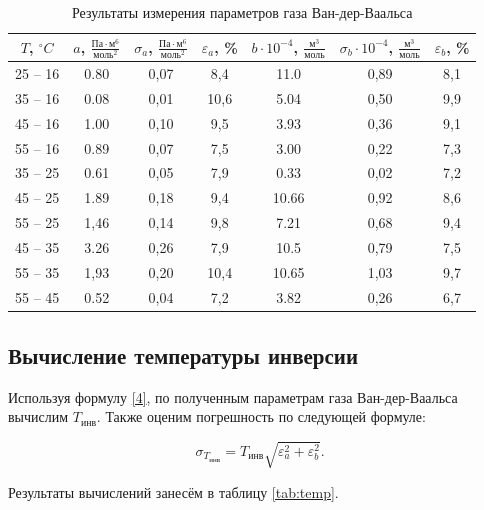 \documentclass[12pt,a4paper]{article}
\begin{document}
\begin{table}[H]
	\centering
	\begin{tabular}{|c|c|c|c|c|c|c|}
		\hline
		$ T $, $ ^\circ C $ & $ a $, $\displaystyle \frac{\text{Па}\cdot\text{м}^6}{\text{моль}^2} $ &$ \sigma_a $, $\displaystyle \frac{\text{Па}\cdot\text{м}^6}{\text{моль}^2} $ & $ \varepsilon_a $, \% & $ b\cdot10^{-4} $, $ \displaystyle\frac{\text{м}^3}{\text{моль}} $ & $ \sigma_b \cdot 10^{-4} $, $\displaystyle \frac{\text{м}^3}{\text{моль}} $ & $ \varepsilon_b $, \% \\ \hline
		25 -- 16 & 0.80 & 0,07 & 8,4 & 11.0 & 0,89 & 8,1 \\ \hline
		35 -- 16 & 0.08 & 0,01 & 10,6 & 5.04 & 0,50 & 9,9 \\ \hline
		45 -- 16 & 1.00 & 0,10 & 9,5 & 3.93 & 0,36 & 9,1 \\ \hline
		55 -- 16 & 0.89 & 0,07 & 7,5 & 3.00 & 0,22 & 7,3 \\ \hline
		35 -- 25 & 0.61 & 0,05 & 7,9 & 0.33 & 0,02 & 7,2 \\ \hline
		45 -- 25 & 1.89 & 0,18 & 9,4 & 10.66 & 0,92 & 8,6 \\ \hline
		55 -- 25 & 1,46 & 0,14 & 9,8 & 7.21 & 0,68 & 9,4 \\ \hline
		45 -- 35 & 3.26 & 0,26 & 7,9 & 10.5 & 0,79 & 7,5 \\ \hline
		55 -- 35 & 1,93 & 0,20 & 10,4 & 10.65 & 1,03 & 9,7 \\ \hline
		55 -- 45 & 0.52 & 0,04 & 7,2 & 3.82 & 0,26 & 6,7 \\ \hline
	\end{tabular}
	\caption{Результаты измерения параметров газа Ван-дер-Ваальса}
	\label{tab:a-b}
\end{table}

\subsection{Вычисление температуры инверсии}

Используя формулу \eqref{4}, по полученным параметрам газа Ван-дер-Ваальса вычислим $ T_\text{инв} $. Также оценим погрешность по следующей формуле:

\[ \sigma_{T_\text{инв}} = T_\text{инв}\sqrt{\varepsilon^2_a+\varepsilon_b^2}. \]

Результаты вычислений занесём в таблицу \ref{tab:temp}.
\end{document}
